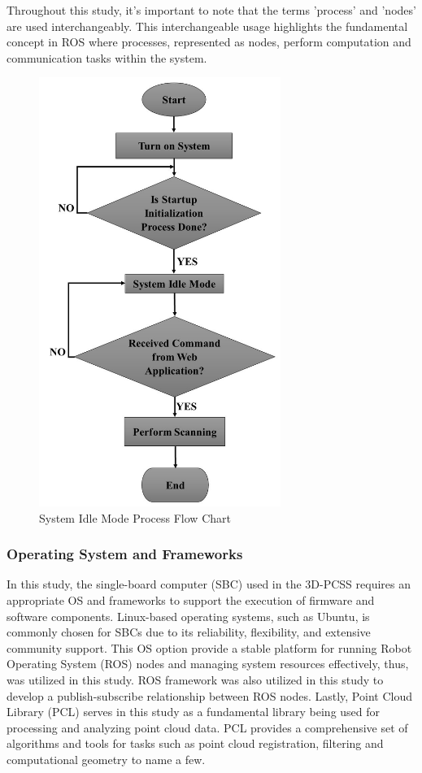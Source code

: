 Throughout this study, it's important to note that the terms 'process' and 'nodes' are used interchangeably. This interchangeable usage highlights the fundamental concept in ROS where processes, represented as nodes, perform computation and communication tasks within the system.

\begin{figure}[H]
	\centering
	\includegraphics[width=0.7\textwidth, height=0.7\textheight]{Figures/software_system_process}
	\caption{System Idle Mode Process Flow Chart}
	\label{ch3:fig:software_system_process}
\end{figure}

\subsubsection{Operating System and Frameworks}

In this study, the single-board computer (SBC) used in the 3D-PCSS requires an appropriate OS and frameworks to support the execution of firmware and software components. Linux-based operating systems, such as Ubuntu, is commonly chosen for SBCs due to its reliability, flexibility, and extensive community support. This OS option provide a stable platform for running Robot Operating System (ROS) nodes and managing system resources effectively, thus, was utilized in this study. ROS framework was also utilized in this study to develop a publish-subscribe relationship between ROS nodes. Lastly, Point Cloud Library (PCL) serves in this study as a fundamental library being used for processing and analyzing point cloud data. PCL provides a comprehensive set of algorithms and tools for tasks such as point cloud registration, filtering and computational geometry to name a few.

